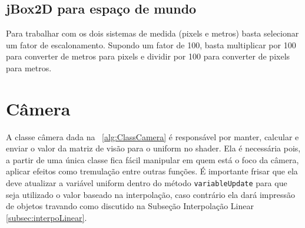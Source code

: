\documentclass[12pt, 
openright, 
oneside, 
a4paper,    
brazil]{facom-ufu-abntex2}
\begin{document}
\subsection{jBox2D para espaço de mundo}

Para trabalhar com os dois sistemas de medida (pixels e metros) basta selecionar um fator de escalonamento. Supondo um fator de 100, basta multiplicar por 100 para converter de metros para pixels e dividir por 100 para converter de pixels para metros.

\section{Câmera}
A classe câmera dada na \lstlistingname~\ref{alg:ClassCamera} é responsável por manter, calcular e enviar o valor da matriz de visão para o uniform no shader. Ela é necessária pois, a partir de uma única classe fica fácil manipular em quem está o foco da câmera, aplicar efeitos como tremulação entre outras funções. É importante frisar que ela deve atualizar a variável uniform dentro do método \texttt{variableUpdate} para que seja utilizado o valor baseado na interpolação, caso contrário ela dará impressão de objetos travando como discutido na Subseção Interpolação Linear \ref{subsec:interpoLinear}.
\end{document}

